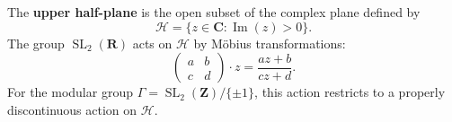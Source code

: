 The \textbf{upper half-plane} is the open subset of the complex plane defined by
$$
\mathcal{H} = \{z \in \mathbf{C} : \operatorname{Im}(z) > 0\}.
$$
The group $\operatorname{SL}_2(\mathbf{R})$ acts on $\mathcal{H}$ by Möbius transformations:
$$
\begin{pmatrix} a & b \\ c & d \end{pmatrix} \cdot z = \frac{az + b}{cz + d}.
$$
For the modular group $\Gamma = \operatorname{SL}_2(\mathbf{Z})/\{\pm 1\}$, this action restricts to a properly discontinuous action on $\mathcal{H}$.
